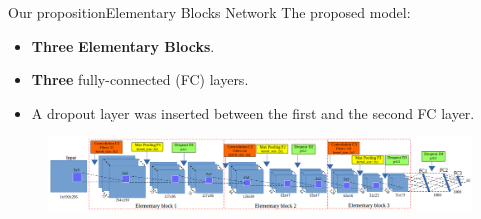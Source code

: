 \documentclass[10pt,svgnames]{beamer}
\begin{document}
\begin{frame}{Our proposition}{Elementary Blocks Network}
	The proposed model: 
		\small{
			\begin{itemize}
				\item \textbf{Three} \textbf{\color{elem}Elementary Blocks}.
    			\item \textbf{Three} {\color{blue}fully-connected} (FC) layers.
    			\item A dropout layer was inserted between the first and the second FC layer.
  			\end{itemize}}
  		
    		\begin{center}
     			\begin{figure}[htbp]
        			\centering
        			\includegraphics[scale=.2]{images/arch_model}
				\end{figure}
     		\end{center}
\end{frame}
\end{document}
